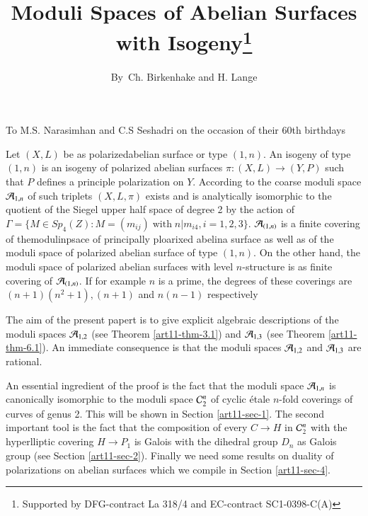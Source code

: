 \title{Moduli Spaces of Abelian Surfaces with Isogeny\footnote{Supported by DFG-contract La 318/4 and EC-contract SC1-0398-C(A)}}

\author{By~Ch. Birkenhake and H. Lange}


\date{}
\maketitle

\begin{center}
To M.S. Narasimhan and C.S Seshadri on the occasion of their 60th birthdays
\end{center}

\noindent
Let $(X, L)$ be as polarized\pageoriginale abelian surface or type $(1,n)$. An isogeny of type $(1,n)$ is an isogeny of polarized abelian surfaces $\pi : (X, L)\rightarrow (Y, P)$ such that $P$ defines a principle polarization on $Y$.
According to \cite{art11-keyH-W} the coarse moduli space $\mathcal{A}_{1,n}$ of such triplets $(X, L, \pi)$ exists and is analytically isomorphic to the quotient of the Siegel upper half space of degree 2 by the action of $\Gamma = \{M \in Sp_{4}(Z): M= (m_{ij}) \;\text{with}\; n|m_{i4}, i= 1,2,3\}$. $\mathcal{A}_{(1,n)}$ is a finite covering of themodulinpsace of principally ploarixed abelina surface as well as of the moduli space of polarized abelian surface of type $(1,n)$. On the other hand, the moduli space of polarized abelian surfaces with level $n$-structure is as finite covering of $\mathcal{A}_{(1,n)}$. If for example $n$ is a prime, the degrees of these coverings are $(n+1)(n^{2}+1), (n+1)$ and $ n(n-1)$ respectively

The aim of the present papert is to give explicit algebraic descriptions of the moduli spaces $\mathcal{A}_{1,2}$ (see Theorem \ref{art11-thm-3.1}) and $\mathcal{A}_{1,3}$ (see Theorem \ref{art11-thm-6.1}). An immediate consequence is that the moduli spaces $\mathcal{A}_{1,2}$ and $\mathcal{A}_{1,3}$ are rational.

An essential ingredient of the proof is the fact that the moduli space $\mathcal{A}_{1,n}$ is canonically isomorphic to the moduli space $\mathcal{C}_{2}^{n}$ of cyclic \'etale $n$-fold coverings of curves of genus 2. This will be shown
in Section \ref{art11-sec-1}. The second important tool is the fact that the composition of every $C \rightarrow H$ in $\mathcal{C}_{2}^{n}$ with the hyperlliptic covering $H \rightarrow P_{1}$ is Galois with the dihedral group $D_{n}$ as Galois group (see Section \ref{art11-sec-2}). Finally we need some results on duality of polarizations on abelian surfaces which we compile in Section \ref{art11-sec-4}.

